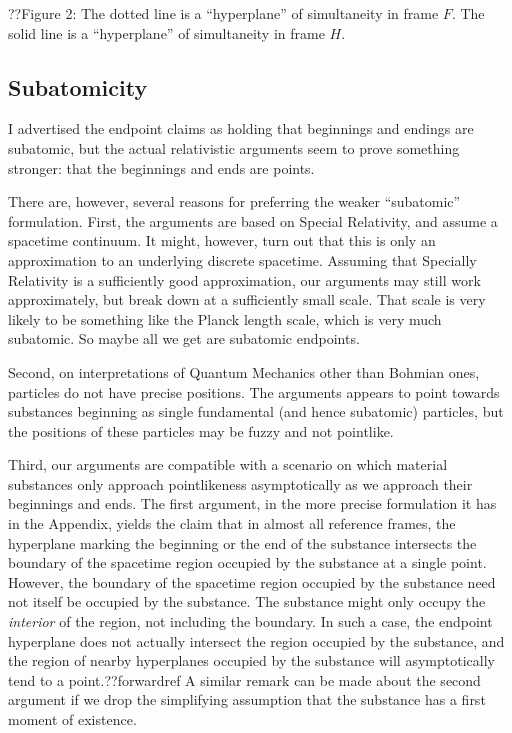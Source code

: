 ??Figure 2: The dotted line is a ``hyperplane'' of simultaneity in frame $F$. The solid line is a ``hyperplane'' of simultaneity in frame $H$.

\subsection{Subatomicity}
I advertised the endpoint claims as holding that beginnings and endings are subatomic, but the actual relativistic 
arguments seem to prove something stronger: that the beginnings and ends are points.

There are, however, several reasons for preferring the weaker ``subatomic'' formulation. First, the arguments are based
on Special Relativity, and assume a spacetime continuum. It might, however, turn out that this is only an approximation 
to an underlying discrete spacetime. Assuming that Specially Relativity is a sufficiently good approximation, our arguments may 
still work approximately, but break down at a sufficiently small scale. That scale is very likely to be something like the 
Planck length scale, which is very much subatomic. So maybe all we get are subatomic endpoints.

Second, on interpretations of Quantum Mechanics other than Bohmian ones, particles do not have precise positions. The arguments 
appears to point towards substances beginning as single fundamental (and hence subatomic) particles, but the positions of these
particles may be fuzzy and not pointlike. 

Third, our arguments are compatible with a scenario on which material substances only approach pointlikeness asymptotically
as we approach their beginnings and ends. The first argument, in the more precise formulation it has in the 
Appendix, yields the claim that in almost all reference frames, the hyperplane marking the beginning or the end of the 
substance intersects the boundary of the spacetime region occupied by the substance at a single point. However, the boundary
of the spacetime region occupied by the substance need not itself be occupied by the substance. The substance might only 
occupy the \textit{interior} of the region, not including the boundary. In such a case, the endpoint hyperplane does not actually
intersect the region occupied by the substance, and the region of nearby hyperplanes occupied by the substance will asymptotically
tend to a point.??forwardref  A similar remark can be made about the second argument if we drop the simplifying assumption that
the substance has a first moment of existence.

